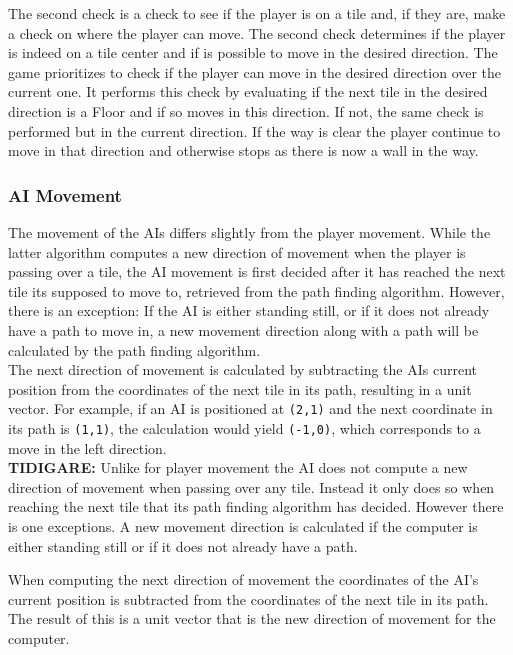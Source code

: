 \documentclass{article}
\begin{document}
The second check is a check to see if the player is on a tile and, if they are, make a check on where the player can move.
The second check determines if the player is indeed on a tile center and if is possible to move in the desired direction. The game prioritizes to check if the player can move in the desired direction over the current one. It performs this check by evaluating if the next tile in the desired direction is a Floor and if so moves in this direction. If not, the same check is performed but in the current direction. If the way is clear the player continue to move in that direction and otherwise stops as there is now a wall in the way.

        \subsubsection{AI Movement}
        The movement of the AIs differs slightly from the player movement. While the latter algorithm computes a new direction of movement when the player is passing over a tile, the AI movement is first decided after it has reached the next tile its supposed to move to, retrieved from the path finding algorithm. However, there is an exception: If the AI is either standing still, or if it does not already have a path to move in, a new movement direction along with a path will be calculated by the path finding algorithm. \\
        \newline
        The next direction of movement is calculated by subtracting the AIs current position from the coordinates of the next tile in its path, resulting in a unit vector. For example, if an AI is positioned at \texttt{(2,1)} and the next coordinate in its path is \texttt{(1,1)}, the calculation would yield \texttt{(-1,0)}, which corresponds to a move in the left direction. \\
        \newline
        \textbf{TIDIGARE:} Unlike for player movement the AI does not compute a new direction of movement when passing over any tile. Instead it only does so when reaching the next tile that its path finding algorithm has decided. However there is one exceptions. A new movement direction is calculated if the computer is either standing still or if it does not already have a path.

When computing the next direction of movement the coordinates of the AI's current position is subtracted from the coordinates of the next tile in its path. The result of this is a unit vector that is the new direction of movement for the computer.
\end{document}
